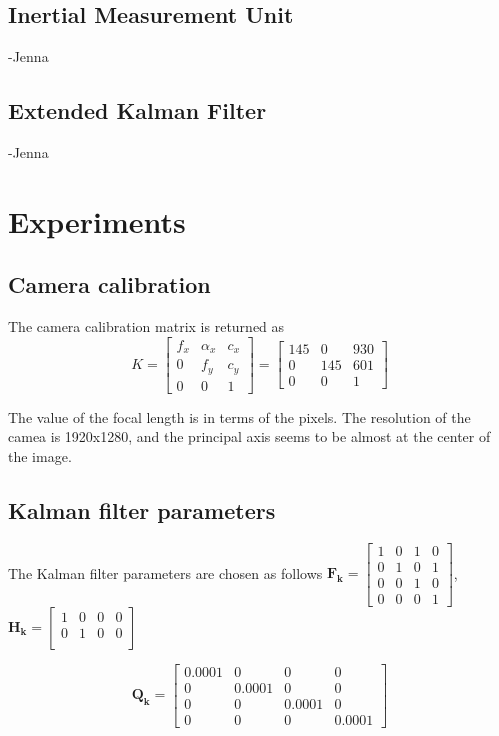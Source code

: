 \documentclass[12pt,twocolumn,letterpaper]{article}
\begin{document}
\subsection{Inertial Measurement Unit}
    -Jenna
\subsection{Extended Kalman Filter}
    -Jenna
\section{Experiments}

\subsection{Camera calibration}
The camera calibration matrix is returned as
\begin{equation}
K = \begin{bmatrix}
f_x & \alpha_x & c_x\\
0 & f_y &  c_y\\
0 & 0 & 1
\end{bmatrix} = \begin{bmatrix}
145 & 0 & 930\\
 0 &145 & 601\\
0 & 0 & 1
\end{bmatrix}
\end{equation}

The value of the focal length is in terms of the pixels. The resolution of the camea is 1920x1280, and the principal axis seems to be almost at the center of the image.

\subsection{Kalman filter parameters}
The Kalman filter parameters are chosen as follows
$ \mathbf{F_k} = \begin{bmatrix}
1 & 0 & 1 & 0\\
0 & 1 & 0 & 1\\
0 & 0 & 1 & 0\\
0 & 0 & 0 & 1
\end{bmatrix} $,
$ \mathbf{H_k} = \begin{bmatrix}
1 & 0 & 0 & 0\\
0 & 1 & 0 & 0\\
\end{bmatrix} $

$$ \mathbf{Q_k} = \begin{bmatrix}
0.0001 & 0 & 0 & 0\\
0 & 0.0001 & 0 & 0\\
0 & 0 & 0.0001 & 0\\
0 & 0 & 0 & 0.0001
\end{bmatrix} $$
\end{document}
